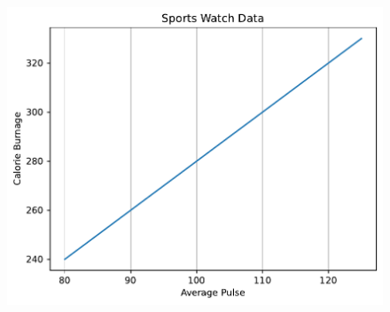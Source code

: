 \begin{code}
\begin{figure}
  \centering
  \includegraphics[scale=0.6]{img/grafica1028.pdf}
\end{figure}
\end{code}


